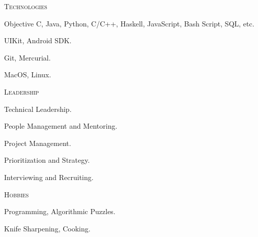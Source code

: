 \documentclass[10pt]{article}
\begin{document}
\vspace{0.16in}

\noindent
\textcolor{Primary}{{\large \textsc{Technologies}}}
\begin{list}{}{\leftmargin=0em}
  \setlength{\itemsep}{1pt}
  \setlength{\parskip}{0pt}
  \setlength{\parsep}{0pt}
  \item{Objective C, Java, Python, C/C++, Haskell, JavaScript, Bash Script, SQL, etc.}
  \item{UIKit, Android SDK.}
  \item{Git, Mercurial.}
  \item{MacOS, Linux.}
\end{list}

\vspace{0.16in}

\noindent
\textcolor{Primary}{{\large \textsc{Leadership}}}
\begin{list}{}{\leftmargin=0em}
  \setlength{\itemsep}{1pt}
  \setlength{\parskip}{0pt}
  \setlength{\parsep}{0pt}
  \item{Technical Leadership.}
  \item{People Management and Mentoring.}
  \item{Project Management.}
  \item{Prioritization and Strategy.}
  \item{Interviewing and Recruiting.}
\end{list}

\vspace{0.16in}

\noindent
\textcolor{Primary}{{\large \textsc{Hobbies}}}
\begin{list}{}{\leftmargin=0em}
  \setlength{\itemsep}{1pt}
  \setlength{\parskip}{0pt}
  \setlength{\parsep}{0pt}
  \item{Programming, Algorithmic Puzzles.}
  \item{Knife Sharpening, Cooking.}
\end{list}
\end{document}
